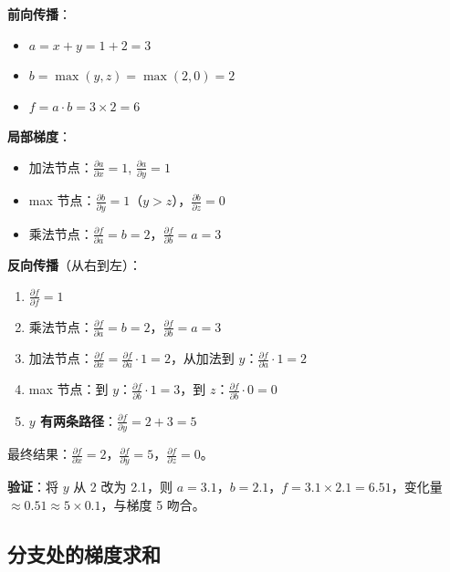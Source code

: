 \documentclass[a4paper]{article}
\begin{document}
\textbf{前向传播}：
\begin{itemize}
    \item $a = x + y = 1 + 2 = 3$
    \item $b = \max(y, z) = \max(2, 0) = 2$
    \item $f = a \cdot b = 3 \times 2 = 6$
\end{itemize}

\textbf{局部梯度}：
\begin{itemize}
    \item 加法节点：$\frac{\partial a}{\partial x} = 1$, $\frac{\partial a}{\partial y} = 1$
    \item max 节点：$\frac{\partial b}{\partial y} = 1$（$y > z$），$\frac{\partial b}{\partial z} = 0$
    \item 乘法节点：$\frac{\partial f}{\partial a} = b = 2$，$\frac{\partial f}{\partial b} = a = 3$
\end{itemize}

\textbf{反向传播}（从右到左）：





\begin{enumerate}
    \item $\frac{\partial f}{\partial f} = 1$
    \item 乘法节点：$\frac{\partial f}{\partial a} = b = 2$，$\frac{\partial f}{\partial b} = a = 3$
    \item 加法节点：$\frac{\partial f}{\partial x} = \frac{\partial f}{\partial a} \cdot 1 = 2$，从加法到 $y$：$\frac{\partial f}{\partial a} \cdot 1 = 2$
    \item max 节点：到 $y$：$\frac{\partial f}{\partial b} \cdot 1 = 3$，到 $z$：$\frac{\partial f}{\partial b} \cdot 0 = 0$
    \item \textbf{$y$ 有两条路径}：$\frac{\partial f}{\partial y} = 2 + 3 = 5$
\end{enumerate}

最终结果：$\frac{\partial f}{\partial x} = 2$，$\frac{\partial f}{\partial y} = 5$，$\frac{\partial f}{\partial z} = 0$。

\textbf{验证}：将 $y$ 从 2 改为 2.1，则 $a = 3.1$，$b = 2.1$，$f = 3.1 \times 2.1 = 6.51$，变化量 $\approx 0.51 \approx 5 \times 0.1$，与梯度 5 吻合。

\subsection{分支处的梯度求和}
\end{document}

